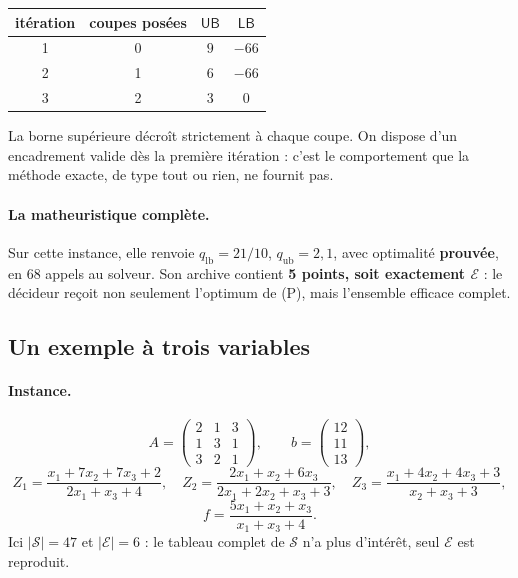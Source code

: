 \documentclass[11pt,a4paper]{article}
\theoremstyle{plain}
\theoremstyle{remark}
\newcommand{\Ecal}{\mathcal{E}}
\newcommand{\Scal}{\mathcal{S}}
\begin{document}
\begin{center}
\small
\begin{tabular}{cccc}
\toprule
itération & coupes posées & $\textsf{UB}$ & $\textsf{LB}$\\
\midrule
1 & 0 & $9$ & $-66$\\
2 & 1 & $6$ & $-66$\\
3 & 2 & $3$ & $0$\\
\bottomrule
\end{tabular}
\end{center}

\noindent
La borne supérieure décroît strictement à chaque coupe. On dispose d'un
encadrement valide dès la première itération : c'est le comportement que la
méthode exacte, de type tout ou rien, ne fournit pas.

\paragraph{La matheuristique complète.} Sur cette instance, elle renvoie
$q_{\text{lb}}=21/10$, $q_{\text{ub}}=2{,}1$, avec optimalité
\textbf{prouvée}, en 68 appels au solveur. Son archive contient
\textbf{5 points, soit exactement $\Ecal$} : le décideur reçoit non seulement
l'optimum de (P), mais l'ensemble efficace complet.

\subsection{Un exemple à trois variables}
\label{sec:ex3}

\paragraph{Instance.}
\[
  A=\begin{pmatrix}2&1&3\\1&3&1\\3&2&1\end{pmatrix},\qquad
  b=\begin{pmatrix}12\\11\\13\end{pmatrix},
\]
\[
  Z_1=\frac{x_1+7x_2+7x_3+2}{2x_1+x_3+4},\quad
  Z_2=\frac{2x_1+x_2+6x_3}{2x_1+2x_2+x_3+3},\quad
  Z_3=\frac{x_1+4x_2+4x_3+3}{x_2+x_3+3},
\]
\[
  f=\frac{5x_1+x_2+x_3}{x_1+x_3+4}.
\]
Ici $|\Scal|=47$ et $|\Ecal|=6$ : le tableau complet de $\Scal$ n'a plus
d'intérêt, seul $\Ecal$ est reproduit.
\end{document}
